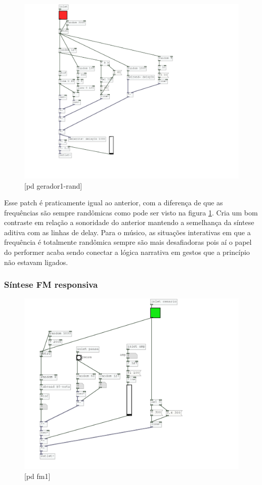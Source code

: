 \documentclass{ppgmus}
\begin{document}
\begin{figure}
\includegraphics[scale=.6]{gerador-sintese1-rand}
\caption{[pd gerador1-rand]}
\label{gerador1rand}
\end{figure}

Esse patch é praticamente igual ao anterior, com a diferença de que as frequências
são sempre randômicas como pode ser visto na figura \ref{gerador1rand}. Cria um bom contraste 
em relação a sonoridade do anterior mantendo a semelhança da síntese aditiva com as linhas de delay. 
Para o músico, as situações interativas em que a frequência é totalmente randômica sempre são mais
desafiadoras pois aí o papel do performer acaba sendo conectar a lógica narrativa em gestos que a
princípio não estavam ligados.


\subsubsection{Síntese FM responsiva}

\begin{figure}
\includegraphics[scale=.6]{gerador-sintese-fm}
\caption{[pd fm1]}
\label{geradorfm}
\end{figure}
\end{document}
